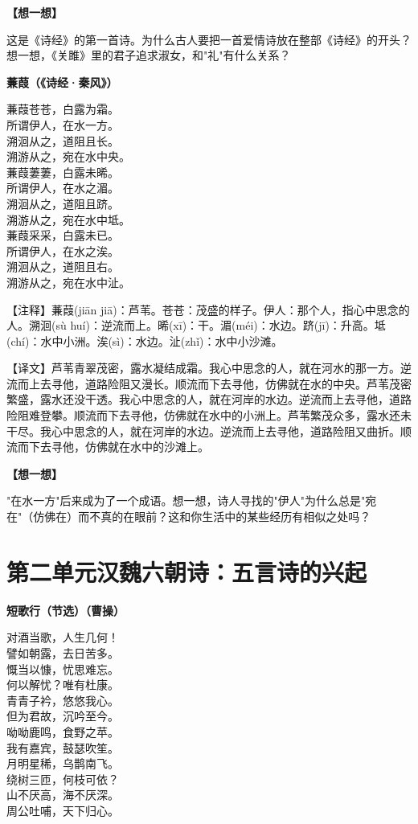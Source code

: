 \documentclass[a4paper,12pt]{ctexart}
\newcommand{\poemtitle}[1]{{\vspace{0.3cm}\noindent\textcolor{orange!80!black}{\large\bfseries #1}\par\vspace{0.1cm}}}
\newcommand{\annot}[1]{{\small\textcolor{blue!60!black}{#1}}}
\newcommand{\thinkq}{\vspace{0.2cm}\noindent\textcolor{orange!60!black}{\small\bfseries【想一想】}\par}
\begin{document}
\thinkq 这是《诗经》的第一首诗。为什么古人要把一首爱情诗放在整部《诗经》的开头？想一想，《关雎》里的君子追求淑女，和"礼"有什么关系？

\poemtitle{蒹葭（《诗经·秦风》）}

蒹葭苍苍，白露为霜。\\
所谓伊人，在水一方。\\
溯洄从之，道阻且长。\\
溯游从之，宛在水中央。\\
蒹葭萋萋，白露未晞。\\
所谓伊人，在水之湄。\\
溯洄从之，道阻且跻。\\
溯游从之，宛在水中坻。\\
蒹葭采采，白露未已。\\
所谓伊人，在水之涘。\\
溯洄从之，道阻且右。\\
溯游从之，宛在水中沚。

\annot{【注释】蒹葭(jiān jiā)：芦苇。苍苍：茂盛的样子。伊人：那个人，指心中思念的人。溯洄(sù huí)：逆流而上。晞(xī)：干。湄(méi)：水边。跻(jī)：升高。坻(chí)：水中小洲。涘(sì)：水边。沚(zhǐ)：水中小沙滩。}

\annot{【译文】芦苇青翠茂密，露水凝结成霜。我心中思念的人，就在河水的那一方。逆流而上去寻他，道路险阻又漫长。顺流而下去寻他，仿佛就在水的中央。芦苇茂密繁盛，露水还没干透。我心中思念的人，就在河岸的水边。逆流而上去寻他，道路险阻难登攀。顺流而下去寻他，仿佛就在水中的小洲上。芦苇繁茂众多，露水还未干尽。我心中思念的人，就在河岸的水边。逆流而上去寻他，道路险阻又曲折。顺流而下去寻他，仿佛就在水中的沙滩上。}

\thinkq "在水一方"后来成为了一个成语。想一想，诗人寻找的"伊人"为什么总是"宛在"（仿佛在）而不真的在眼前？这和你生活中的某些经历有相似之处吗？

\newpage

\section*{\textcolor{orange!80!black}{第二单元\quad 汉魏六朝诗：五言诗的兴起}}

\poemtitle{短歌行（节选）（曹操）}

对酒当歌，人生几何！\\
譬如朝露，去日苦多。\\
慨当以慷，忧思难忘。\\
何以解忧？唯有杜康。\\
青青子衿，悠悠我心。\\
但为君故，沉吟至今。\\
呦呦鹿鸣，食野之苹。\\
我有嘉宾，鼓瑟吹笙。\\
月明星稀，乌鹊南飞。\\
绕树三匝，何枝可依？\\
山不厌高，海不厌深。\\
周公吐哺，天下归心。
\end{document}
